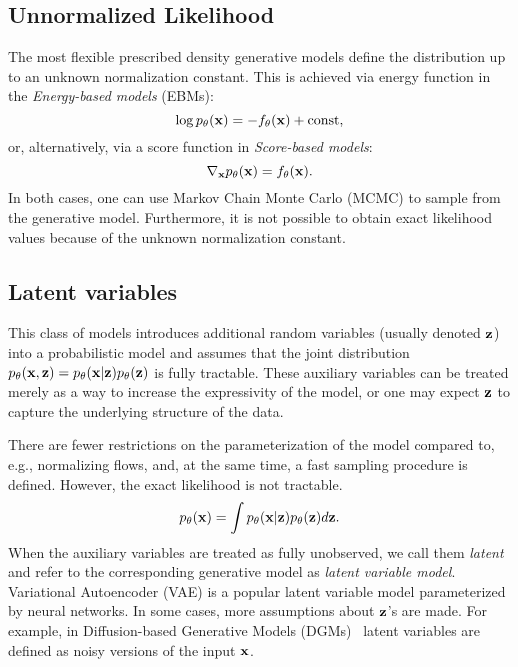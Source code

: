 \subsection{Unnormalized Likelihood}
The most flexible prescribed density generative models define the distribution up to an unknown normalization constant. 
This is achieved via energy function in the \textit{Energy-based models} (EBMs): 
\begin{equation}
    \log p_{\theta}({\mathbf{x}}) = -f_{\theta}({\mathbf{x}}) + \text{const},
\end{equation}
or, alternatively, via a score function in \textit{Score-based models}:
\begin{equation}\label{eq:intro_score}
    \nabla_{\rvx} p_{\theta}(\rvx) = f_{\theta}(\rvx).
\end{equation}
In both cases, one can use Markov Chain Monte Carlo (MCMC) to sample from the generative model.   Furthermore, it is not possible to obtain exact likelihood values because of the unknown normalization constant. 



\subsection{Latent variables}
This class of models introduces additional random variables (usually denoted ${\mathbf{z}}$) into a probabilistic model and assumes that the joint distribution $p_{\theta}({\mathbf{x}}, {\mathbf{z}}) = p_{\theta}({\mathbf{x}}| {\mathbf{z}})p_{\theta}({\mathbf{z}})$ is fully tractable. These auxiliary variables can be treated merely as a way to increase the expressivity of the model, or one may expect ${\mathbf{z}}$ to capture the underlying structure of the data. 

There are fewer restrictions on the parameterization of the model compared to, e.g., normalizing flows, and, at the same time, a fast sampling procedure is defined. However, the exact likelihood is not tractable. 
\begin{equation}\label{eq:intro_lvm_def}
     p_{\theta}(\rvx) = \int  p_{\theta}(\rvx| \rvz)p_{\theta}(\rvz) d\rvz.
\end{equation}
When the auxiliary variables are treated as fully unobserved, we call them \textit{latent} and refer to the corresponding generative model as \textit{latent variable model}. 
Variational Autoencoder (VAE) \citep{kingma2014autoencoding, rezende2014stochastic} is a popular latent variable model parameterized by neural networks. 
In some cases, more assumptions about ${\mathbf{z}}$'s are made. For example, in Diffusion-based Generative Models (DGMs)~\citep{sohl2015deep, ho2020denoising} latent variables are defined as noisy versions of the input ${\mathbf{x}}$. 

